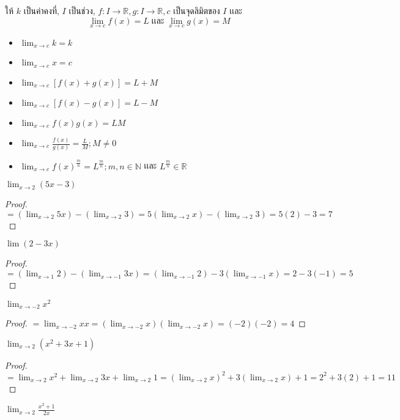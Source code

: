 \documentclass[a4paper,12pt]{scrartcl}
\begin{document}
\begin{theorem*}
	ให้ $k$ เป็นค่าคงที่, $I$ เป็นช่วง, $f: I \rightarrow \mathbb{R}, g: I \rightarrow \mathbb{R}, c$ เป็นจุดลิมิตของ $I$ เเละ \[ \lim_{x \to c} f(x) = L \; \text{เเละ} \; \lim_{x \to c} g(x) = M \]
	\begin{itemize}
		\item $\lim_{x \to c} k = k$ 
		\item $ \lim_{x \to c} x = c$ 
		\item $ \lim_{x \to c} [f(x)+g(x)]  = L+M$ 
		\item $ \lim_{x \to c} [f(x)-g(x)]  = L-M$ 
		\item $ \lim_{x \to c} f(x)g(x) = LM$
		\item $\lim_{x \to c} \frac{f(x)}{g(x)} =\frac{L}{M} ; M \not = 0$
		\item $\lim_{x \to c} f(x)^{\frac{m}{n}} = L^{\frac{m}{n}} ; m,n \in \mathbb{N} $ เเละ $L^{\frac{m}{n}} \in \mathbb{R}$
	\end{itemize}
\end{theorem*}
\begin{example}
	$\lim_{x \to 2} (5x-3)$
\end{example}
\begin{proof}
	$= (\lim_{x \to 2} 5x) - ( \lim_{ x \to 2} 3) = 5(\lim_{x \to 2} x) - (\lim_{x \to 2} 3) =5(2)-3=7$
\end{proof}
\begin{example}
	$\lim(2-3x)$
\end{example}
\begin{proof}
	$= (\lim_{x \to 1 } 2)  - (\lim_{x \to -1} 3x) = (\lim_{x \to -1} 2) - 3(\lim_{x \to -1}x) =2-3(-1)=5$	
\end{proof}
\begin{example}
	$\lim_{x \to -2} x^2$
\end{example}
\begin{proof}
	$=\lim_{x \to -2} xx = (\lim_{x \to -2} x)(\lim_{x \to -2} x) = (-2)(-2)=4$
\end{proof}
\begin{example}
	$\lim_{x \to 2}(x^2+3x+1)$
\end{example}
\begin{proof}
	$= \lim_{x \to 2} x^2 + \lim_{x \to 2} 3x + \lim_{x \to 2} 1 = (\lim_{x \to 2} x)^2 +3(\lim_{x \to 2} x) +1 = 2^2 +3(2)+1=11$
\end{proof}

\begin{example}
	$\lim_{x \to 2} \frac{x^2+1}{2x}$
\end{example}
\end{document}

